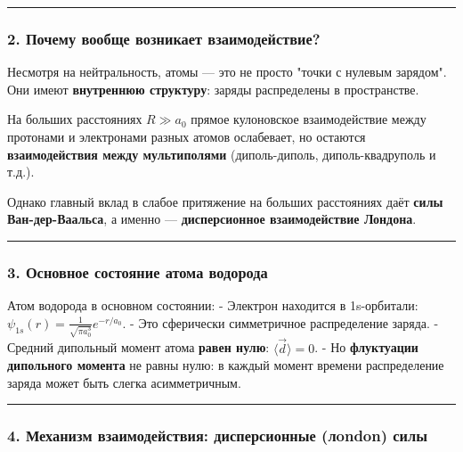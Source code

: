 \documentclass[11pt]{article}
\begin{document}
\begin{center}\rule{0.5\linewidth}{\linethickness}\end{center}

\subsubsection{2. Почему вообще возникает
взаимодействие?}\label{ux43fux43eux447ux435ux43cux443-ux432ux43eux43eux431ux449ux435-ux432ux43eux437ux43dux438ux43aux430ux435ux442-ux432ux437ux430ux438ux43cux43eux434ux435ux439ux441ux442ux432ux438ux435}

Несмотря на нейтральность, атомы --- это не просто "точки с нулевым
зарядом".\\
Они имеют \textbf{внутреннюю структуру}: заряды распределены в
пространстве.

На больших расстояниях \(R \gg a_0\) прямое кулоновское взаимодействие
между протонами и электронами разных атомов ослабевает, но остаются
\textbf{взаимодействия между мультиполями} (диполь-диполь,
диполь-квадруполь и т.д.).

Однако главный вклад в слабое притяжение на больших расстояниях даёт
\textbf{силы Ван-дер-Ваальса}, а именно --- \textbf{дисперсионное
взаимодействие Лондона}.

\begin{center}\rule{0.5\linewidth}{\linethickness}\end{center}

\subsubsection{3. Основное состояние атома
водорода}\label{ux43eux441ux43dux43eux432ux43dux43eux435-ux441ux43eux441ux442ux43eux44fux43dux438ux435-ux430ux442ux43eux43cux430-ux432ux43eux434ux43eux440ux43eux434ux430}

Атом водорода в основном состоянии: - Электрон находится в 1s-орбитали:
\(\psi_{1s}(r) = \frac{1}{\sqrt{\pi a_0^3}} e^{-r/a_0}\). - Это
сферически симметричное распределение заряда. - Средний дипольный момент
атома \textbf{равен нулю}: \(\langle \vec{d} \rangle = 0\). - Но
\textbf{флуктуации дипольного момента} не равны нулю: в каждый момент
времени распределение заряда может быть слегка асимметричным.

\begin{center}\rule{0.5\linewidth}{\linethickness}\end{center}

\subsubsection{4. Механизм взаимодействия: дисперсионные (лondon)
силы}\label{ux43cux435ux445ux430ux43dux438ux437ux43c-ux432ux437ux430ux438ux43cux43eux434ux435ux439ux441ux442ux432ux438ux44f-ux434ux438ux441ux43fux435ux440ux441ux438ux43eux43dux43dux44bux435-ux43bondon-ux441ux438ux43bux44b}
\end{document}
